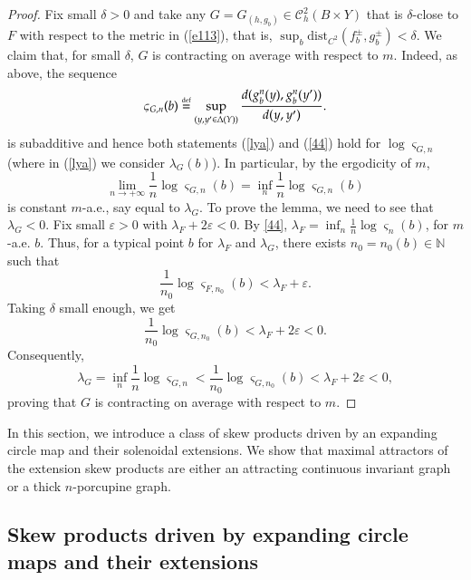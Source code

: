 \documentclass[11pt,reqno]{amsart}
\theoremstyle{plain}
\newtheorem*{theorem A}{Theorem A}
\newtheorem*{theorem B}{Theorem B}
\newtheorem*{theorem C}{Theorem C}
\newtheorem*{theorem 1}{Theorem 1}
\newtheorem*{theorem 2}{Theorem 2}
\newtheorem*{theorem 3}{Theorem 3}
\newcommand{\eqdef}{\stackrel{\scriptscriptstyle\rm def}{=}}
\numberwithin{equation}{section}
\begin{document}
\begin{proof}
Fix small $\delta>0$ and take any ${G}={G}_{(h,g_b)} \in \mathcal{C}^2_{h}(B\times Y)$ that is $\delta$-close to ${F}$ with respect to the metric in (\ref{e113}), that is, $\sup_{b} \text{dist}_{C^2}(f_b^{\pm}, g_b^{\pm})< \delta$.
We claim that, for small $\delta$, $G$ is contracting on average with respect to $m$. Indeed, as above, the sequence
\begin{equation}\label{per}
\varsigma_{{G},n} (b)\eqdef \sup_{(y,y^{\prime}\in \Delta (Y))}\frac{d(g_b^n(y) , g_b^n(y^{\prime}))}{d(y,y^{\prime})}.
\end{equation}
is subadditive and hence both statements (\ref{lya}) and (\ref{44}) hold for $\log \varsigma_{{G},n}$ (where in (\ref{lya}) we consider $\lambda_G(b)$).
In particular, by the ergodicity of $m$,
$$
\lim_{n \to +\infty}\frac{1}{n}\log \varsigma_{{G},n}(b)= \inf_{n}\frac{1}{n}\log \varsigma_{{G},n}(b)
$$
is constant $m$-a.e., say equal to $\lambda_{{G}}$. To prove the lemma, we need to see that $\lambda_{{G}}<0$.
Fix small $\varepsilon>0$ with $\lambda_{{F}}+2\varepsilon <0$.
By \eqref{44}, $\lambda_{{F}}=\inf_{n}\frac{1}{n}\log \varsigma_n(b)$, for $m$-a.e. $b$. Thus, for a typical point $b$ for $\lambda_{{F}}$ and $\lambda_{{G}}$, there exists $n_0=n_0(b) \in \mathbb{N}$ such that
$$
\frac{1}{n_0}\log \varsigma_{{F}, n_0}(b)< \lambda_{{F}}+\varepsilon.
$$
Taking $\delta$ small enough, we get
$$
\frac{1}{n_0}\log \varsigma_{{G},n_0}(b)< \lambda_{{F}}+2 \varepsilon <0.
$$
Consequently,
$$
\lambda_{{G}}=\inf_{n}\frac{1}{n}\log \varsigma_{G,n}< \frac{1}{n_0}\log \varsigma_{G,n_0}(b)< \lambda_{{F}} + 2\varepsilon <0,
$$
proving that ${G}$ is contracting on average with respect to $m$.
\end{proof}

In this section, we introduce a class of skew products driven by an expanding circle map and their solenoidal extensions. We show that maximal attractors of the extension skew products are either an attracting continuous invariant graph or a thick $n$-porcupine graph.

\subsection{Skew products driven by expanding circle maps and their extensions}\label{section}
\end{document}
